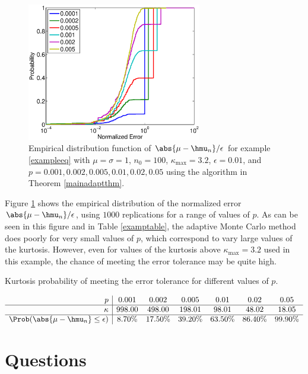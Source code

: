 \documentclass[12pt]{amsart}
\begin{document}
\begin{figure}
\includegraphics[width=3in]{NormalErrFig.eps}
\caption{Empirical distribution function of $\abs{\mu-\hmu_n}/\epsilon$ for example \eqref{exampleeq} with $\mu=\sigma=1$, $n_0=100$, $\kappa_{\max} = 3.2$, $\epsilon=0.01$, and  $p=0.001, 0.002, 0.005, 0.01, 0.02, 0.05$ using the algorithm in Theorem \ref{mainadaptthm}. \label{normalerrfig}}
\end{figure}

Figure \ref{normalerrfig} shows the empirical distribution of the normalized error $\abs{\mu-\hmu_n}/\epsilon$, using $1000$ replications for a range of values of $p$.  As can be seen in this figure and in Table \ref{examptable}, the adaptive Monte Carlo method does poorly for very small values of $p$, which correspond to vary large values of the kurtosis.  However, even for values of the kurtosis above $\kappa_{\max}=3.2$ used in this example, the chance of meeting the error tolerance may be quite high.

\begin{table}
\caption{Kurtosis probability of meeting the error tolerance for different values of $p$. \label{examptable}}
\[
\begin{array}{r|ccccccccccc}
p &   0.001 &    0.002 &    0.005 &     0.01 &     0.02 &     0.05 \\
\hline
\kappa &  998.00 &   498.00 &   198.01 &    98.01 &    48.02 &    18.05 \\
\hline
\Prob(\abs{\mu-\hmu_n} \le \epsilon) &    8.70\% &    17.50\% &    39.20\% &    63.50\% &    86.40\% &    99.90\% \\
\end{array}
\]
\end{table}


\section{Questions}
\end{document}
